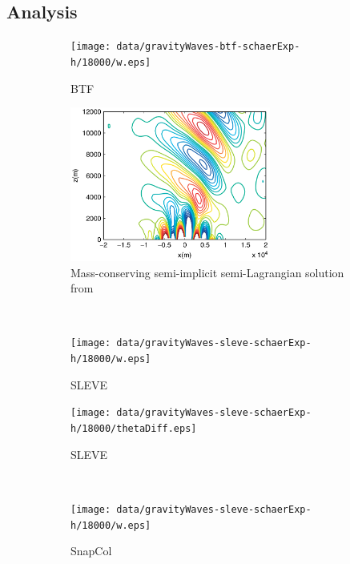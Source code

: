 \subsection{Analysis}

\begin{figure}
	\centering
	\begin{subfigure}[b]{0.48\textwidth}
		\texttt{[image: data/gravityWaves-btf-schaerExp-h/18000/w.eps]}\vspace{2em}
		\caption{BTF}
		\label{fig:gw:w:btf}
	\end{subfigure}
	\hfill
	\begin{subfigure}[b]{0.48\textwidth}
		\includegraphics[height=2in]{img/melvin-7a.png}
		\caption{Mass-conserving semi-implicit semi-Lagrangian solution from \textcite{melvin2010}}
		\label{fig:gw:w:melvin}
	\end{subfigure} \\
%
	\begin{subfigure}[b]{0.48\textwidth}
		\texttt{[image: data/gravityWaves-sleve-schaerExp-h/18000/w.eps]}
		\caption{SLEVE}
		\label{fig:gw:w:sleve}
	\end{subfigure}
	\hfill
	\begin{subfigure}[b]{0.48\textwidth}
		\texttt{[image: data/gravityWaves-sleve-schaerExp-h/18000/thetaDiff.eps]}
		\caption{SLEVE}
		\label{fig:gw:thetaDiff:sleve}
	\end{subfigure} \\
%
	\begin{subfigure}[b]{0.48\textwidth}
		\texttt{[image: data/gravityWaves-sleve-schaerExp-h/18000/w.eps]}\vspace{3em}
		\caption{SnapCol}
		\label{fig:gw:w:snapCol}
	\end{subfigure}
	\hfill
	\begin{subfigure}[b]{0.48\textwidth}

\end{subfigure}
\end{figure}

